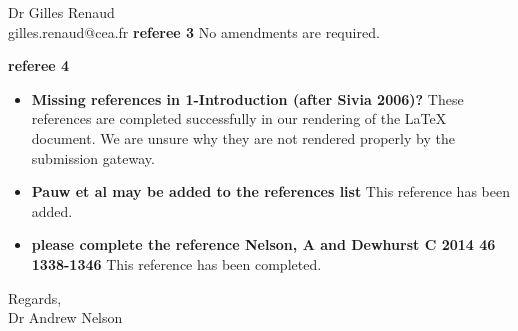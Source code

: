 \documentclass[fontsize=12pt, paper=a4]{scrlttr2}
\begin{document}
\begin{letter}{Dr Gilles Renaud \\ gilles.renaud@cea.fr}
\textbf{referee 3}
No amendments are required.


\textbf{referee 4}
\begin{itemize}
\item \textbf{Missing references in 1-Introduction (after Sivia 2006)?} These references are completed successfully in our rendering of the \LaTeX{} document. We are unsure why they are not rendered properly by the submission gateway.
\item \textbf{Pauw et al may be added to the references list} This reference has been added.
\item \textbf{please complete the reference Nelson, A and Dewhurst C 2014 46 1338-1346} This reference has been completed.
\end{itemize}


\closing{Regards, \\ Dr Andrew Nelson} %

\end{letter}
\end{document}

